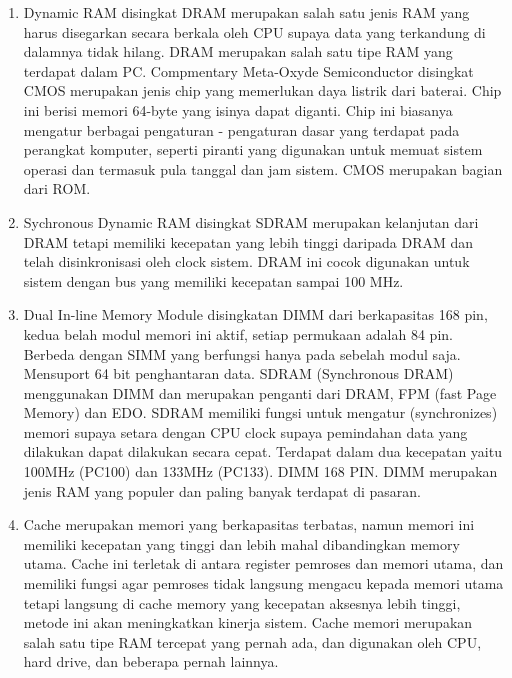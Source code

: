 \begin{enumerate}
\item Dynamic RAM disingkat DRAM merupakan salah satu jenis RAM yang harus disegarkan secara berkala oleh CPU supaya data yang terkandung di dalamnya tidak hilang. DRAM merupakan salah satu tipe RAM yang terdapat dalam PC.
Compmentary Meta-Oxyde Semiconductor disingkat CMOS merupakan jenis chip yang memerlukan daya listrik dari baterai. Chip ini berisi memori 64-byte yang isinya dapat diganti. Chip ini biasanya mengatur berbagai pengaturan - pengaturan dasar yang terdapat 
pada perangkat komputer, seperti piranti yang digunakan untuk memuat sistem operasi dan termasuk pula tanggal dan jam sistem. CMOS merupakan bagian dari ROM.

\item Sychronous Dynamic RAM disingkat SDRAM merupakan kelanjutan dari DRAM tetapi memiliki kecepatan yang lebih tinggi daripada DRAM dan telah disinkronisasi oleh clock sistem. DRAM ini cocok digunakan untuk sistem dengan bus yang memiliki kecepatan sampai 100 MHz.

\item Dual In-line Memory Module disingkatan DIMM dari  berkapasitas 168 pin, kedua belah modul memori ini aktif, setiap permukaan adalah 84 pin. Berbeda dengan SIMM yang berfungsi hanya pada sebelah modul saja. Mensuport 64 bit penghantaran data. SDRAM
(Synchronous DRAM) menggunakan DIMM dan merupakan penganti dari DRAM, FPM (fast Page Memory) dan EDO. SDRAM memiliki fungsi untuk mengatur (synchronizes) memori supaya setara dengan CPU clock supaya pemindahan data yang dilakukan dapat dilakukan secara cepat. Terdapat dalam dua kecepatan yaitu 100MHz (PC100) dan 133MHz (PC133). DIMM 168 PIN. DIMM merupakan jenis RAM yang populer dan paling banyak terdapat di pasaran.

\item Cache merupakan memori yang berkapasitas terbatas, namun memori ini memiliki kecepatan  yang tinggi dan lebih mahal dibandingkan memory utama. Cache ini terletak di antara register pemroses dan memori utama, dan memiliki fungsi agar pemroses tidak langsung mengacu kepada memori utama tetapi langsung di cache memory yang kecepatan aksesnya lebih tinggi, metode ini akan meningkatkan kinerja sistem. Cache memori merupakan salah satu tipe RAM tercepat yang pernah ada, dan digunakan oleh CPU, hard drive, dan beberapa pernah lainnya.


\end{enumerate}
